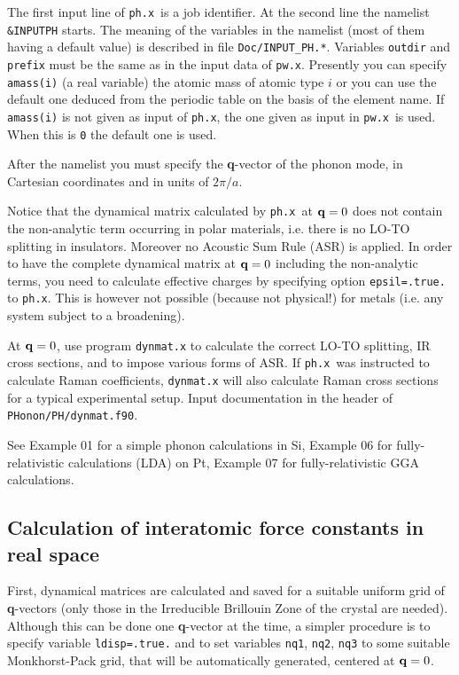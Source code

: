 \documentclass[12pt,a4paper]{article}
\def\pwx{\texttt{pw.x}}
\def\phx{\texttt{ph.x}}
\begin{document}
The first input line of \phx\ is a job identifier. At the second line the
namelist {\tt \&INPUTPH} starts. The meaning of the variables in the namelist
(most of them having a default value) is described in file 
\texttt{Doc/INPUT\_PH.*}. Variables \texttt{outdir} and \texttt{prefix} 
must be the same as in the input data of \pwx. Presently
you can specify \texttt{amass(i)} (a real variable) the atomic mass 
of atomic type $i$ or you can use the default one deduced from the
periodic table on the basis of the element name. If 
{\tt amass(i)} is not given as input of \phx, the one given as
input in \pwx\ is used. When this is {\tt 0} the default one is used.

After the namelist you must specify the {\bf q}-vector of the phonon mode,
in Cartesian coordinates and in units of $2\pi/a$.
    
Notice that the dynamical matrix calculated by \phx\ at ${\bf q}=0$ does not
contain the non-analytic term occurring in polar materials, i.e. there is no
LO-TO splitting in insulators. Moreover no Acoustic Sum Rule (ASR) is
applied. In order to have the complete dynamical matrix at ${\bf q}=0$ 
including the non-analytic terms, you need to calculate effective charges 
by specifying option \texttt{epsil=.true.} to \phx. This is however not 
possible (because not physical!) for metals (i.e. any system subject to 
a broadening).

At ${\bf q}=0$, use program \texttt{dynmat.x} to calculate the correct LO-TO 
splitting, IR cross sections, and to impose various forms of ASR. 
If \phx\ was instructed to calculate Raman coefficients, 
\texttt{dynmat.x} will also calculate Raman cross sections
for a typical experimental setup.
Input documentation in the header of \texttt{PHonon/PH/dynmat.f90}.

See Example 01 for a simple phonon calculations in Si, Example 06 for 
fully-relativistic calculations (LDA) on Pt, Example 07 for 
fully-relativistic GGA calculations.

\subsection{Calculation of interatomic force constants in real space}

First, dynamical matrices are calculated and saved for a suitable uniform 
grid of {\bf q}-vectors (only those in the Irreducible Brillouin Zone of the
crystal are needed). Although this can be done one {\bf q}-vector at the 
time, a
simpler procedure is to specify variable \texttt{ldisp=.true.} and to set 
variables \texttt{nq1}, \texttt{nq2}, \texttt{nq3} to some suitable 
Monkhorst-Pack grid, that will be automatically generated, centered at 
${\bf q}=0$. 
    
\end{document}
